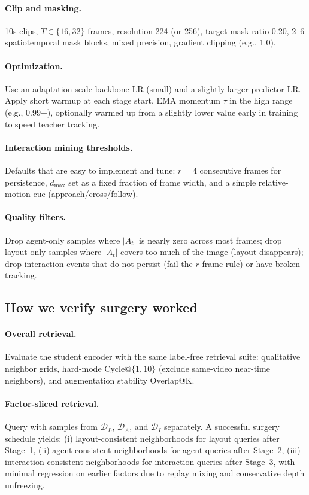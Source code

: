 \paragraph{Clip and masking.} 10s clips, $T\in\{16,32\}$ frames, resolution 224 (or 256), target-mask ratio 0.20, 2--6 spatiotemporal mask blocks, mixed precision, gradient clipping (e.g., 1.0).
\paragraph{Optimization.} Use an adaptation-scale backbone LR (small) and a slightly larger predictor LR. Apply short warmup at each stage start. EMA momentum $\tau$ in the high range (e.g., 0.99+), optionally warmed up from a slightly lower value early in training to speed teacher tracking.
\paragraph{Interaction mining thresholds.} Defaults that are easy to implement and tune:
$r{=}4$ consecutive frames for persistence, $d_{\max}$ set as a fixed fraction of frame width, and a simple relative-motion cue (approach/cross/follow).
\paragraph{Quality filters.} Drop agent-only samples where $|A_t|$ is nearly zero across most frames; drop layout-only samples where $|A_t|$ covers too much of the image (layout disappears); drop interaction events that do not persist (fail the $r$-frame rule) or have broken tracking.

\subsection{How we verify surgery worked}\label{sec:surgery_verify}
\paragraph{Overall retrieval.} Evaluate the student encoder with the same label-free retrieval suite: qualitative neighbor grids, hard-mode Cycle@$\{1,10\}$ (exclude same-video near-time neighbors), and augmentation stability Overlap@K.
\paragraph{Factor-sliced retrieval.} Query with samples from $\mathcal{D}_L$, $\mathcal{D}_A$, and $\mathcal{D}_I$ separately. A successful surgery schedule yields:
(i) layout-consistent neighborhoods for layout queries after Stage~1,
(ii) agent-consistent neighborhoods for agent queries after Stage~2,
(iii) interaction-consistent neighborhoods for interaction queries after Stage~3,
with minimal regression on earlier factors due to replay mixing and conservative depth unfreezing.

